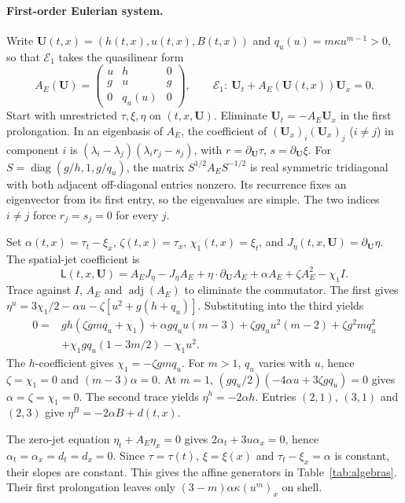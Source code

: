\documentclass[12pt,a4paper,oneside]{report}
\numberwithin{equation}{chapter}
\theoremstyle{definition}
\theoremstyle{remark}\newtheorem{remark}[theorem]{Remark}
\begin{document}
\paragraph{First-order Eulerian system.}\label{app:eulerian}
Write $\mathbf U(t,x)=(h(t,x),u(t,x),B(t,x))$ and $q_u(u)=m\kappa u^{m-1}>0$, so that $\mathcal E_1$ takes the quasilinear form
\[
 A_E(\mathbf U)=\begin{pmatrix}u&h&0\\ g&u&g\\0&q_u(u)&0\end{pmatrix},
 \qquad \mathcal E_1:\ \mathbf U_t+A_E(\mathbf U(t,x))\mathbf U_x=0 .
\]
Start with unrestricted $\tau,\xi,\eta$ on $(t,x,\mathbf U)$. Eliminate $\mathbf U_t=-A_E\mathbf U_x$ in the first prolongation. In an eigenbasis of $A_E$, the coefficient of $(\mathbf U_x)_i(\mathbf U_x)_j$ ($i\ne j$) in component $i$ is $(\lambda_i-\lambda_j)(\lambda_i r_j-s_j)$, with $r=\partial_{\mathbf U}\tau$, $s=\partial_{\mathbf U}\xi$. For $S=\operatorname{diag}(g/h,1,g/q_u)$, the matrix $S^{1/2}A_ES^{-1/2}$ is real symmetric tridiagonal with both adjacent off-diagonal entries nonzero. Its recurrence fixes an eigenvector from its first entry, so the eigenvalues are simple. The two indices $i\ne j$ force $r_j=s_j=0$ for every $j$.

Set $\alpha(t,x)=\tau_t-\xi_x$, $\zeta(t,x)=\tau_x$, $\chi_1(t,x)=\xi_t$, and $J_\eta(t,x,\mathbf U)=\partial_{\mathbf U}\eta$. The spatial-jet coefficient is
\[
 \mathsf L(t,x,\mathbf U)=A_EJ_\eta-J_\eta A_E+\eta\cdot\partial_{\mathbf U}A_E
   +\alpha A_E+\zeta A_E^2-\chi_1 I .
\]
Trace against $I$, $A_E$ and $\operatorname{adj}(A_E)$ to eliminate the commutator. The first gives $\eta^u=3\chi_1/2-\alpha u-\zeta[u^2+g(h+q_u)]$. Substituting into the third yields
\[
 \begin{split}
 0={}&g h(\zeta g m q_u+\chi_1)+\alpha g q_u u(m-3)
 +\zeta gq_u u^2(m-2)+\zeta g^2m q_u^2\\
 &+\chi_1gq_u(1-3m/2)-\chi_1u^2 .
 \end{split}
\]
The $h$-coefficient gives $\chi_1=-\zeta gm q_u$. For $m>1$, $q_u$ varies with $u$, hence $\zeta=\chi_1=0$ and $(m-3)\alpha=0$. At $m=1$, $(gq_u/2)(-4\alpha u+3\zeta gq_u)=0$ gives $\alpha=\zeta=\chi_1=0$. The second trace yields $\eta^h=-2\alpha h$. Entries $(2,1)$, $(3,1)$ and $(2,3)$ give $\eta^B=-2\alpha B+d(t,x)$.

The zero-jet equation $\eta_t+A_E\eta_x=0$ gives $2\alpha_t+3u\alpha_x=0$, hence $\alpha_t=\alpha_x=d_t=d_x=0$. Since $\tau=\tau(t)$, $\xi=\xi(x)$ and $\tau_t-\xi_x=\alpha$ is constant, their slopes are constant. This gives the affine generators in Table~\ref{tab:algebras}. Their first prolongation leaves only $(3-m)\alpha\kappa(u^m)_x$ on shell.
\end{document}

